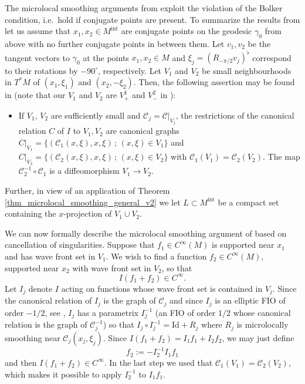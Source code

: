 \documentclass[12pt,twoside]{amsart}
\numberwithin{equation}{section}
\begin{document}
The microlocal smoothing arguments from \cite{MSU15} exploit the violation of the Bolker condition, i.e.\ hold if conjugate points are present.  To summarize the results from \cite{MSU15} let us assume that $x_1,x_2 \in M^{\mathrm{int}}$ are conjugate points on the geodesic $\gamma_0$ from above with no further conjugate points in between them. Let $v_1, v_2$ be the tangent vectors to $\gamma_0$ at the points $x_1, x_2 \in M$ and $\xi_j = (R_{-\pi/2} v_j)^{\flat}$ correspond to their rotations by $-90^{\circ}$, respectively. Let $V_1$ and $V_2$ be small neighbourhoods in $T^* M$ of $(x_1, \xi_1)$ and $(x_2,-\xi_2)$. Then, the following assertion may be found in \cite[Theorem 4.2]{MSU15} (note that our $V_1$ and $V_2$ are $V^1_+$ and $V^2_-$ in \cite{MSU15}):
\begin{itemize}
\item[(ii)] If $V_1$, $V_2$ are sufficiently small and $\mathcal{C}_j = \mathcal{C}|_{V_j}$, the restrictions of the canonical relation $C$ of $I$ to $V_1, V_2$ are canonical graphs $C|_{V_1} = \{ (\mathcal{C}_1(x,\xi), x,\xi) \,;\, (x,\xi) \in V_1 \}$ and $C|_{V_2} =  \{ (\mathcal{C}_2(x,\xi), x,\xi) \,;\, (x,\xi) \in V_2 \}$ with $\mathcal{C}_1(V_1) = \mathcal{C}_2(V_2)$. The map $\mathcal{C}_2^{-1} \circ \mathcal{C}_1$ is a diffeomorphism $V_1 \to V_2$. 
\end{itemize} 
Further, in view of an application of Theorem \ref{thm_microlocal_smoothing_general_v2} we let $L \subset M^{\mathrm{int}}$ be a compact set containing the $x$-projection of $V_1 \cup V_2$.

We can now formally describe the microlocal smoothing argument of \cite{MSU15} based on cancellation of singularities. Suppose that $f_1 \in C^{\infty}(M)$ is supported near $x_1$ and has wave front set in $V_1$. We wish to find a function $f_2 \in C^{\infty}(M)$, supported near $x_2$ with wave front set in $V_2$, so that 
\[
I(f_1 + f_2) \in C^{\infty}.
\]
Let $I_j$ denote $I$ acting on functions whose wave front set is contained in $V_j$. Since the canonical relation of $I_j$ is the graph of $\mathcal{C}_j$ and since $I_j$ is an elliptic FIO of order $-1/2$, see \cite[proof of Theorem 4.3]{MSU15}, $I_j$ has a parametrix $I_j^{-1}$ (an FIO of order $1/2$ whose canonical relation is the graph of $\mathcal{C}_j^{-1}$) so that $I_j \circ I_j^{-1} = \mathrm{Id} + R_j$ where $R_j$ is microlocally smoothing near $\mathcal{C}_j(x_j, \xi_j)$. Since $I(f_1 + f_2) = I_1 f_1 + I_2 f_2$, we may just define 
\[
f_2 := -I_2^{-1} I_1 f_1
\]
and then $I(f_1 + f_2) \in C^{\infty}$. In the last step we used that $\mathcal{C}_1(V_1) = \mathcal{C}_2(V_2)$, which makes it possible to apply $I_2^{-1}$ to $I_1 f_1$.
\end{document}
